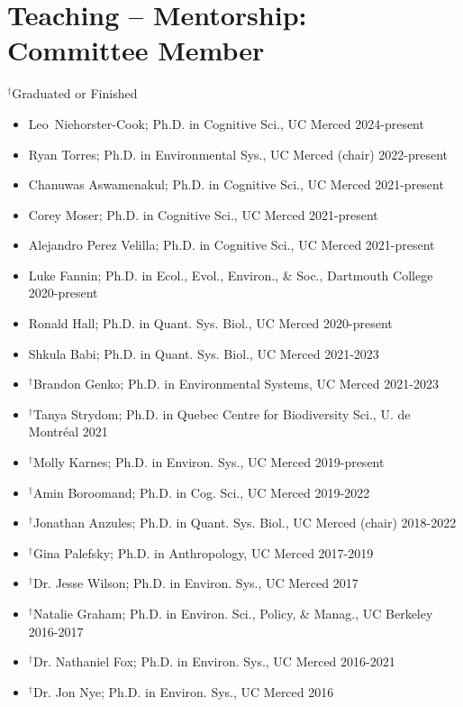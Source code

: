 \documentclass[margin,line,12pt]{res}
\begin{document}
\begin{resume}
\begin{itemize}
\end{itemize}


\section{\sc Teaching -- Mentorship: \\ Committee Member}
{\footnotesize{${}^\dag$Graduated or Finished}}
\begin{itemize}
  \item Leo Niehorster-Cook; Ph.D. in Cognitive Sci., UC Merced \hfill 2024-present
  \item Ryan Torres; Ph.D. in Environmental Sys., UC Merced (chair) \hfill 2022-present
  \item Chanuwas Aswamenakul; Ph.D. in Cognitive Sci., UC Merced \hfill 2021-present 
  \item Corey Moser; Ph.D. in Cognitive Sci., UC Merced \hfill 2021-present
  \item Alejandro Perez Velilla; Ph.D. in Cognitive Sci., UC Merced \hfill 2021-present
  \item Luke Fannin; Ph.D. in Ecol., Evol., Environ., \& Soc., Dartmouth College \hfill 2020-present
  \item Ronald Hall; Ph.D. in Quant. Sys. Biol., UC Merced \hfill 2020-present
  \item Shkula Babi; Ph.D. in Quant. Sys. Biol., UC Merced \hfill 2021-2023
  \item ${}^\dag$Brandon Genko; Ph.D. in Environmental Systems, UC Merced \hfill 2021-2023
  \item ${}^\dag$Tanya Strydom; Ph.D. in Quebec Centre for Biodiversity Sci., U. de Montr\'eal \hfill 2021
  \item ${}^\dag$Molly Karnes; Ph.D. in Environ. Sys., UC Merced \hfill 2019-present
  \item ${}^\dag$Amin Boroomand; Ph.D. in Cog. Sci., UC Merced \hfill 2019-2022
  \item ${}^\dag$Jonathan Anzules; Ph.D. in Quant. Sys. Biol., UC Merced (chair) \hfill 2018-2022
  \item ${}^\dag$Gina Palefsky; Ph.D. in Anthropology, UC Merced \hfill 2017-2019
  \item ${}^\dag$Dr. Jesse Wilson; Ph.D. in Environ. Sys., UC Merced \hfill 2017
  \item ${}^\dag$Natalie Graham; Ph.D. in Environ. Sci., Policy, \& Manag., UC Berkeley \hfill 2016-2017
  \item ${}^\dag$Dr. Nathaniel Fox; Ph.D. in Environ. Sys., UC Merced \hfill 2016-2021
  \item ${}^\dag$Dr. Jon Nye; Ph.D. in Environ. Sys., UC Merced \hfill 2016
\end{itemize}




\end{resume}
\end{document}
